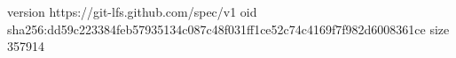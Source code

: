 version https://git-lfs.github.com/spec/v1
oid sha256:dd59c223384feb57935134c087c48f031ff1ce52c74c4169f7f982d6008361ce
size 357914
